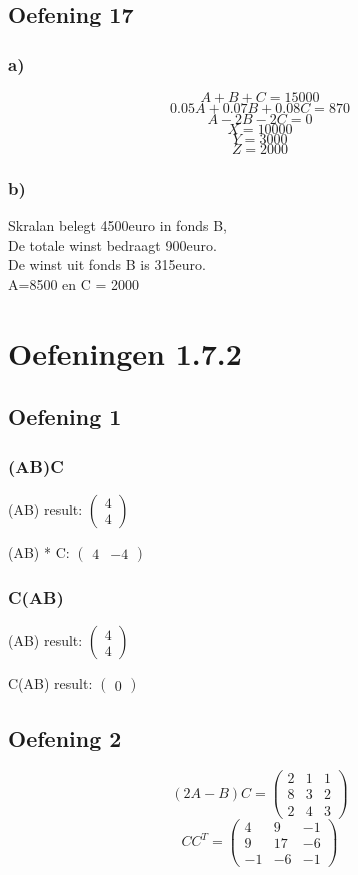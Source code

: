 \documentclass[lineaire_algebra_oplossingen.tex]{subfiles}
\begin{document}
\subsection{Oefening 17}
\subsubsection*{a)}
\[A + B + C = 15000\]
\[0.05A + 0.07B + 0.08C = 870\]
\[A-2B-2C=0\]
\[\]
\[X = 10000\]
\[Y = 3000\]
\[Z = 2000\]
\subsubsection*{b)}
Skralan belegt 4500euro in fonds B, \\
De totale winst bedraagt 900euro. \\
De winst uit fonds B is 315euro. \\
A=8500 en C = 2000


\section{Oefeningen 1.7.2}

\subsection{Oefening 1}
\subsubsection*{(AB)C}
(AB) result:
$
\begin{pmatrix}

4\\
4

\end{pmatrix}
$

(AB) * C:
$
\begin{pmatrix}
4 & -4
\end{pmatrix}
$

\subsubsection*{C(AB)}
(AB) result:
$
\begin{pmatrix}
4\\
4
\end{pmatrix}
$

C(AB) result:
$
\begin{pmatrix}
0
\end{pmatrix}
$

\subsection{Oefening 2}
\[(2A-B)C = 
\begin{pmatrix}
2 &  1 &  1\\
8 &  3 &  2\\
2 &  4 &  3
\end{pmatrix}
\]
\[ CC^T =
\begin{pmatrix}
4 &  9 &  -1\\
9 &  17 &  -6\\
-1 &  -6 &  -1
\end{pmatrix}
\]
\end{document}
